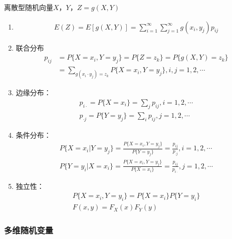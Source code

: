 \documentclass[12pt]{book}
\begin{document}
离散型随机向量$X$，$Y$，$Z=g(X,Y)$


\begin{enumerate}[1.]
    \item \begin{gather*}
        E(Z) = E[g(X,Y)] 
        = \sum_{i=1}^{\infty}\sum_{j=1}^{\infty}{g(x_i,y_j)p_{ij}}
    \end{gather*}
    \item 联合分布
    \begin{align*}
        p_{ij} &= P\{X=x_i,Y=y_j\} 
        = P\{Z=z_{k}\}
        = P\{ g(X,Y)=z_{k} \} \\
        &= \sum_{g(x_i\cdot y_j)=z_k}{ P\{X=x_i,Y=y_j\} } , i,j=1,2,\cdots
    \end{align*}
    \item 边缘分布：
    \begin{gather*}
        p_{i\cdot} 
        = P\{X=x_i\}
        = \sum_{j}{p_{ij}}, i=1,2,\cdots \\
        p_{\cdot j} 
        = P\{Y=y_j\}
        = \sum_{i}{p_{ij}} , j=1,2,\cdots
    \end{gather*}
    \item 条件分布：
    \begin{gather*}
        P\{X=x_i|Y=y_j\}
        = \frac{P\{X=x_i, Y=y_j\}}{P\{Y=y_j\}}
        = \frac{p_{ij}}{p_{\cdot j}}, i=1,2,\cdots \\
        P\{Y=y_i|X=x_i\}
        = \frac{P\{X=x_i, Y=y_j\}}{P\{X=x_i\}}
        = \frac{p_{ij}}{p_{i\cdot}}, j=1,2,\cdots
    \end{gather*}
    \item 独立性：
          \begin{gather*}
              P\{X=x_i,Y=y_i\} 
              = P\{X=x_i\} P\{Y=y_i\} \\
              F(x,y)=F_{X}(x) F_{Y}(y)
          \end{gather*}
\end{enumerate}




\subsubsection{多维随机变量}
\end{document}
